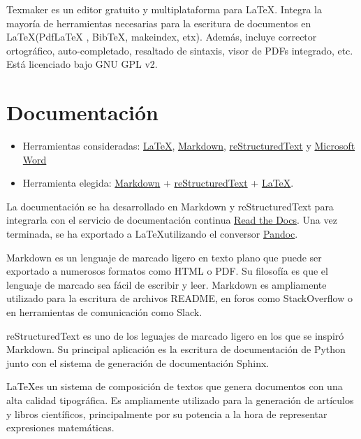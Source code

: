 Texmaker es un editor gratuito y multiplataforma para \LaTeX. Integra la
mayoría de herramientas necesarias para la escritura de documentos en
\LaTeX (PdfLaTeX , BibTeX, makeindex, etx). Además, incluye corrector
ortográfico, auto-completado, resaltado de sintaxis, visor de PDFs
integrado, etc. Está licenciado bajo GNU GPL v2.

\section{Documentación}\label{documentacion}

\begin{itemize}
\tightlist
\item
  Herramientas consideradas:
  \href{https://www.latex-project.org/}{LaTeX},
  \href{http://daringfireball.net/projects/markdown/}{Markdown},
  \href{http://docutils.sourceforge.net/docs/ref/rst/restructuredtext.html}{reStructuredText} y  
  \href{https://products.office.com/es-es/word}{Microsoft Word}
\item
  Herramienta elegida:
  \href{http://daringfireball.net/projects/markdown/}{Markdown} +
  \href{http://docutils.sourceforge.net/docs/ref/rst/restructuredtext.html}{reStructuredText} +
  \href{https://www.latex-project.org/}{\LaTeX}.
\end{itemize}

La documentación se ha desarrollado en Markdown y reStructuredText para integrarla con el
servicio de documentación continua \href{https://readthedocs.org/}{Read
the Docs}. Una vez terminada, se ha exportado a \LaTeX utilizando el
conversor \href{http://pandoc.org/}{Pandoc}.

Markdown es un lenguaje de marcado ligero en texto plano que puede ser
exportado a numerosos formatos como HTML o PDF. Su filosofía es que el
lenguaje de marcado sea fácil de escribir y leer. Markdown es
ampliamente utilizado para la escritura de archivos README, en foros
como StackOverflow o en herramientas de comunicación como Slack.

reStructuredText es uno de los leguajes de marcado ligero en los que se 
inspiró Markdown. Su principal aplicación es la escritura de documentación 
de Python junto con el sistema de generación de documentación Sphinx.

\LaTeX es un sistema de composición de textos que genera documentos con
una alta calidad tipográfica. Es ampliamente utilizado para la
generación de artículos y libros científicos, principalmente por su
potencia a la hora de representar expresiones matemáticas.

